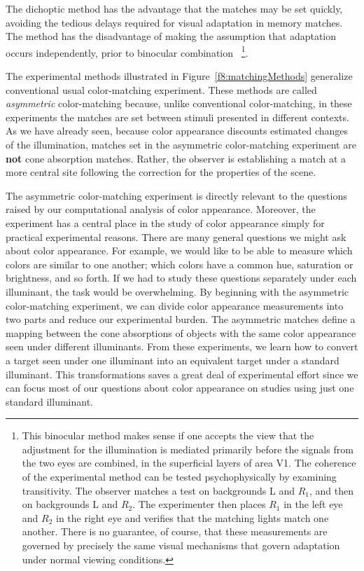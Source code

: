 The dichoptic method has the advantage that the matches may be set
quickly, avoiding the tedious delays required for visual adaptation in
memory matches.  The method has the disadvantage of making the
assumption that adaptation occurs independently, prior to binocular
combination ~\footnote{ This binocular method makes sense if one
accepts the view that the adjustment for the illumination is mediated
primarily before the signals from the two eyes are combined, in the
superficial layers of area V1.  The coherence of the experimental
method can be tested psychophysically by examining transitivity.  The
observer matches a test on backgrounds L and $R_1$, and then on
backgrounds L and $R_2$.  The experimenter then places $R_1$ in the
left eye and $R_2$ in the right eye and verifies that the matching
lights match one another.  There is no guarantee, of course, that
these measurements are governed by precisely the same visual
mechanisms that govern adaptation under normal viewing conditions.  }.

The experimental methods illustrated in Figure~\ref{f8:matchingMethods}
generalize conventional usual color-matching experiment.  These
methods are called {\em asymmetric} color-matching because, unlike
conventional color-matching, in these experiments the matches are set
between stimuli presented in different contexts.  As we have already
seen, because color appearance discounts estimated changes of the
illumination, matches set in the asymmetric color-matching experiment
are {\bf not} cone absorption matches.  Rather, the observer is
establishing a match at a more central site following the correction
for the properties of the scene.

The asymmetric color-matching experiment is directly relevant to the
questions raised by our computational analysis of color appearance.
Moreover, the experiment has a central place in the study of color
appearance simply for practical experimental reasons.  There are many
general questions we might ask about color appearance.  For example,
we would like to be able to measure which colors are similar to one
another; which colors have a common hue, saturation or brightness, and
so forth.  If we had to study these questions separately under each
illuminant, the task would be overwhelming.  By beginning with the
asymmetric color-matching experiment, we can divide color appearance
measurements into two parts and reduce our experimental burden.  The
asymmetric matches define a mapping between the cone absorptions of
objects with the same color appearance seen under different
illuminants.  From these experiments, we learn how to convert a target
seen under one illuminant into an equivalent target under a standard
illuminant.  This transformations saves a great deal of experimental
effort since we can focus most of our questions about color appearance
on studies using just one standard illuminant.

